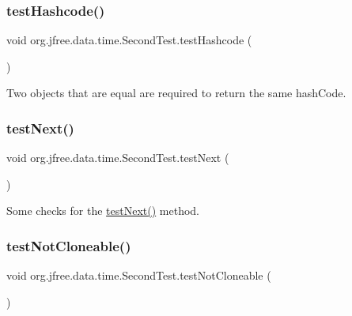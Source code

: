 \subsubsection{\texorpdfstring{test\+Hashcode()}{testHashcode()}}
{\footnotesize\ttfamily void org.\+jfree.\+data.\+time.\+Second\+Test.\+test\+Hashcode (\begin{DoxyParamCaption}{ }\end{DoxyParamCaption})}

Two objects that are equal are required to return the same hash\+Code. \mbox{\label{classorg_1_1jfree_1_1data_1_1time_1_1_second_test_a9e6632c5ae1aedc12dc1a8fb58111e31}} 
\subsubsection{\texorpdfstring{test\+Next()}{testNext()}}
{\footnotesize\ttfamily void org.\+jfree.\+data.\+time.\+Second\+Test.\+test\+Next (\begin{DoxyParamCaption}{ }\end{DoxyParamCaption})}

Some checks for the \mbox{\hyperlink{classorg_1_1jfree_1_1data_1_1time_1_1_second_test_a9e6632c5ae1aedc12dc1a8fb58111e31}{test\+Next()}} method. \mbox{\label{classorg_1_1jfree_1_1data_1_1time_1_1_second_test_a8a2c8569d34a7f295a83260cb8e2b96a}} 
\subsubsection{\texorpdfstring{test\+Not\+Cloneable()}{testNotCloneable()}}
{\footnotesize\ttfamily void org.\+jfree.\+data.\+time.\+Second\+Test.\+test\+Not\+Cloneable (\begin{DoxyParamCaption}{ }\end{DoxyParamCaption})}

